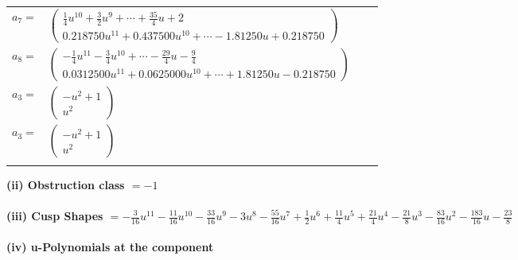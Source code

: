\documentclass[1p]{elsarticle_modified}
\theoremstyle{definition}
\begin{document}
\begin{tabular}{m{7pt} m{180pt} m{7pt} m{180pt} }
\flushright $a_{7}=$&$\begin{pmatrix}\frac{1}{4} u^{10}+\frac{3}{2} u^9+\cdots+\frac{35}{4} u+2\\0.218750 u^{11}+0.437500 u^{10}+\cdots-1.81250 u+0.218750\end{pmatrix}$ \\
\flushright $a_{8}=$&$\begin{pmatrix}-\frac{1}{4} u^{11}-\frac{3}{4} u^{10}+\cdots-\frac{29}{4} u-\frac{9}{4}\\0.0312500 u^{11}+0.0625000 u^{10}+\cdots+1.81250 u-0.218750\end{pmatrix}$ \\
\flushright $a_{3}=$&$\begin{pmatrix}- u^2+1\\u^2\end{pmatrix}$\\ \flushright $a_{3}=$&$\begin{pmatrix}- u^2+1\\u^2\end{pmatrix}$\\&\end{tabular}
\flushleft \textbf{(ii) Obstruction class $= -1$}\\~\\
\flushleft \textbf{(iii) Cusp Shapes $= -\frac{3}{16} u^{11}-\frac{11}{16} u^{10}-\frac{33}{16} u^9-3 u^8-\frac{55}{16} u^7+\frac{1}{2} u^6+\frac{11}{4} u^5+\frac{21}{4} u^4-\frac{21}{8} u^3-\frac{83}{16} u^2-\frac{183}{16} u-\frac{23}{8}$}\\~\\
\newpage\renewcommand{\arraystretch}{1}
\flushleft \textbf{(iv) u-Polynomials at the component}\newline \\
\end{document}
